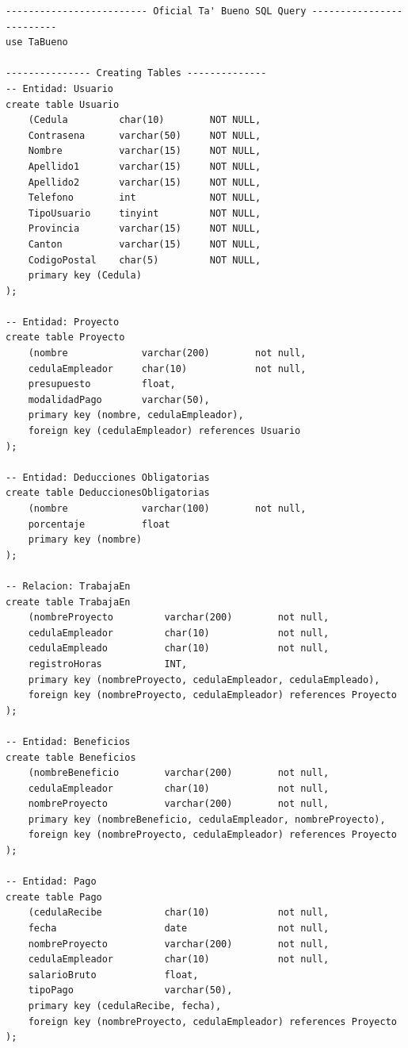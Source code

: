 \documentclass{article}
\begin{document}
\begin{verbatim}
------------------------- Oficial Ta' Bueno SQL Query -------------------------
use TaBueno

--------------- Creating Tables --------------
-- Entidad: Usuario
create table Usuario 
    (Cedula         char(10)        NOT NULL, 
    Contrasena      varchar(50)     NOT NULL,
    Nombre          varchar(15)     NOT NULL,
    Apellido1       varchar(15)     NOT NULL,
    Apellido2       varchar(15)     NOT NULL,
    Telefono        int             NOT NULL,
    TipoUsuario     tinyint         NOT NULL,
    Provincia       varchar(15)     NOT NULL,
    Canton          varchar(15)     NOT NULL,
    CodigoPostal    char(5)         NOT NULL,
    primary key (Cedula)
);

-- Entidad: Proyecto
create table Proyecto
    (nombre             varchar(200)        not null,
    cedulaEmpleador     char(10)            not null,
    presupuesto         float,
    modalidadPago       varchar(50),
    primary key (nombre, cedulaEmpleador),
    foreign key (cedulaEmpleador) references Usuario
);

-- Entidad: Deducciones Obligatorias
create table DeduccionesObligatorias
    (nombre             varchar(100)        not null,
    porcentaje          float       
    primary key (nombre)
);

-- Relacion: TrabajaEn
create table TrabajaEn
    (nombreProyecto         varchar(200)        not null,
    cedulaEmpleador         char(10)            not null,
    cedulaEmpleado          char(10)            not null,
    registroHoras           INT,
    primary key (nombreProyecto, cedulaEmpleador, cedulaEmpleado),
    foreign key (nombreProyecto, cedulaEmpleador) references Proyecto
);

-- Entidad: Beneficios
create table Beneficios
    (nombreBeneficio        varchar(200)        not null,
    cedulaEmpleador         char(10)            not null,
    nombreProyecto          varchar(200)        not null,
    primary key (nombreBeneficio, cedulaEmpleador, nombreProyecto),
    foreign key (nombreProyecto, cedulaEmpleador) references Proyecto
);

-- Entidad: Pago
create table Pago
    (cedulaRecibe           char(10)            not null,
    fecha                   date                not null,
    nombreProyecto          varchar(200)        not null,
    cedulaEmpleador         char(10)            not null,
    salarioBruto            float,
    tipoPago                varchar(50),
    primary key (cedulaRecibe, fecha),
    foreign key (nombreProyecto, cedulaEmpleador) references Proyecto
);


\end{verbatim}
\end{document}
